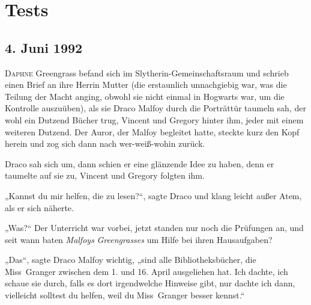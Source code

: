 \chapter{Tests}

\section{4. Juni 1992}

\lettrine{D}{aphne} Greengrass befand sich im Slytherin-Gemeinschaftsraum und schrieb einen Brief an ihre Herrin Mutter (die erstaunlich unnachgiebig war, was die Teilung der Macht anging, obwohl sie nicht einmal in Hogwarts war, um die Kontrolle auszuüben), als sie Draco Malfoy durch die Porträttür taumeln sah, der wohl ein Dutzend Bücher trug, Vincent und Gregory hinter ihm, jeder mit einem weiteren Dutzend. Der Auror, der Malfoy begleitet hatte, steckte kurz den Kopf herein und zog sich dann nach wer-weiß-wohin zurück.

Draco sah sich um, dann schien er eine glänzende Idee zu haben, denn er taumelte auf sie zu, Vincent und Gregory folgten ihm.

„Kannst du mir helfen, die zu lesen?“, sagte Draco und klang leicht außer Atem, als er sich näherte.

„Was?“ Der Unterricht war vorbei, jetzt standen nur noch die Prüfungen an, und seit wann baten \emph{Malfoys} \emph{Greengrasses} um Hilfe bei ihren Hausaufgaben?

„Das“, sagte Draco Malfoy wichtig, „sind alle Bibliotheksbücher, die Miss~Granger zwischen dem 1. und 16. April ausgeliehen hat. Ich dachte, ich schaue sie durch, falls es dort irgendwelche Hinweise gibt, nur dachte ich dann, vielleicht solltest du helfen, weil du Miss~Granger besser kennst.“

